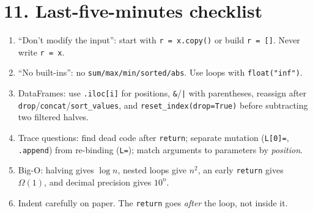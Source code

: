 \documentclass[10pt]{article}
\newcommand{\code}[1]{\lstinline[basicstyle=\ttfamily\small]{#1}}
\begin{document}
\section*{11. Last-five-minutes checklist}
\begin{enumerate}[leftmargin=*]
\item ``Don't modify the input'': start with \code{r = x.copy()} or build \code{r = []}. Never write \code{r = x}.
\item ``No built-ins'': no \code{sum/max/min/sorted/abs}. Use loops with \code{float("inf")}.
\item DataFrames: use \code{.iloc[i]} for positions, \code{&}/\code{|} with parentheses, reassign after \code{drop}/\code{concat}/\code{sort_values}, and \code{reset_index(drop=True)} before subtracting two filtered halves.
\item Trace questions: find dead code after \code{return}; separate mutation (\code{L[0]=}, \code{.append}) from re-binding (\code{L=}); match arguments to parameters by \emph{position}.
\item Big-O: halving gives $\log n$, nested loops give $n^2$, an early \code{return} gives $\Omega(1)$, and decimal precision gives $10^n$.
\item Indent carefully on paper. The \code{return} goes \emph{after} the loop, not inside it.
\end{enumerate}
\end{document}
